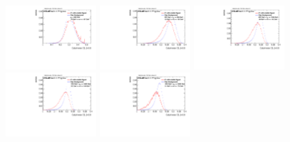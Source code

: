 \begin{figure}
\includegraphics[width=0.3\textwidth]{sascha_input/Appendix/Distributions/higgs/distributions/beta05/h_recoJet_C2_05_bin1.pdf} \hspace{1mm}
\includegraphics[width=0.3\textwidth]{sascha_input/Appendix/Distributions/higgs/distributions/beta05/h_recoJet_C2_05_bin2.pdf} \hspace{4mm}
\includegraphics[width=0.3\textwidth]{sascha_input/Appendix/Distributions/higgs/distributions/beta05/h_recoJet_C2_05_bin3.pdf} 
\bigskip
\includegraphics[width=0.3\textwidth]{sascha_input/Appendix/Distributions/higgs/distributions/beta05/h_recoJet_C2_05_bin4.pdf} \hspace{4mm}
\includegraphics[width=0.3\textwidth]{sascha_input/Appendix/Distributions/higgs/distributions/beta05/h_recoJet_C2_05_bin5.pdf} 


\end{figure}
